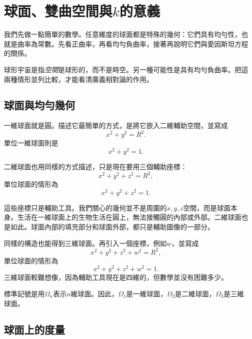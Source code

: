 \chapter{球面、雙曲空間與\(k\)的意義}

我們先做一點簡單的數學。任意維度的球面都是特殊的幾何：它們具有均勻性，也就是曲率為常數。先看正曲率，再看均勻負曲率，接著再說明它們與愛因斯坦方程的關係。

球形宇宙是指\emph{空間}是球形的，而不是時空。另一種可能性是具有均勻負曲率。把這兩種情形並列比較，才能看清廣義相對論的作用。

\section{球面與均勻幾何}

一維球面就是圓。描述它最簡單的方式，是將它嵌入二維輔助空間，並寫成
\begin{equation}
x^2+y^2=R^2.
\end{equation}
單位一維球面則是
\begin{equation}
x^2+y^2=1.
\end{equation}

二維球面也用同樣的方式描述，只是現在要用三個輔助座標：
\begin{equation}
x^2+y^2+z^2=R^2,
\end{equation}
單位球面的情形為
\begin{equation}
x^2+y^2+z^2=1.
\end{equation}

這些座標只是輔助工具。我們關心的幾何並不是周圍的\(x,y,z\)空間，而是球面本身。生活在一維球面上的生物生活在圓上，無法接觸圓的內部或外部。二維球面也是如此。球面內部的填充部分和球面外部，都只是輔助圖像的一部分。

同樣的構造也能得到三維球面。再引入一個座標，例如\(w\)，並寫成
\begin{equation}
x^2+y^2+z^2+w^2=R^2,
\end{equation}
單位球面的情形為
\begin{equation}
x^2+y^2+z^2+w^2=1.
\end{equation}
三維球面較難想像，因為輔助工具現在是四維的，但數學並沒有困難多少。

標準記號是用\(\Omega_n\)表示\(n\)維球面。因此，\(\Omega_1\)是一維球面，\(\Omega_2\)是二維球面，\(\Omega_3\)是三維球面。

\section{球面上的度量}

